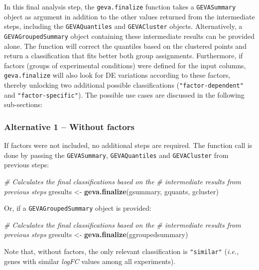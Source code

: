 \documentclass[
  12pt,
]{article}
\newenvironment{Shaded}{\begin{snugshade}}{\end{snugshade}}
\newcommand{\CommentTok}[1]{\textcolor[rgb]{0.56,0.35,0.01}{\textit{#1}}}
\newcommand{\KeywordTok}[1]{\textcolor[rgb]{0.13,0.29,0.53}{\textbf{#1}}}
\newcommand{\NormalTok}[1]{#1}
\newcommand{\StringTok}[1]{\textcolor[rgb]{0.31,0.60,0.02}{#1}}
\begin{document}
In this final analysis step, the \texttt{geva.finalize} function takes a
\texttt{GEVASummary} object as argument in addition to the other values
returned from the intermediate steps, including the
\texttt{GEVAQuantiles} and \texttt{GEVACluster} objects. Alternatively,
a \texttt{GEVAGroupedSummary} object containing these intermediate
results can be provided alone. The function will correct the quantiles
based on the clustered points and return a classification that fits
better both group assignments. Furthermore, if factors (groups of
experimental conditions) were defined for the input columns,
\texttt{geva.finalize} will also look for DE variations according to
these factors, thereby unlocking two additional possible classifications
(\texttt{"factor-dependent"} and \texttt{"factor-specific"}). The
possible use cases are discussed in the following sub-sections:

\hypertarget{alternative-1-without-factors}{%
\subsubsection{Alternative 1 -- Without
factors}\label{alternative-1-without-factors}}

If factors were not included, no additional steps are required. The
function call is done by passing the \texttt{GEVASummary},
\texttt{GEVAQuantiles} and \texttt{GEVACluster} from previous steps:

\begin{Shaded}
\begin{Highlighting}[]
\CommentTok{# Calculates the final classifications based on the}
\CommentTok{# intermediate results from previous steps}
\NormalTok{gresults <-}\StringTok{ }\KeywordTok{geva.finalize}\NormalTok{(gsummary, gquants, gcluster)}
\end{Highlighting}
\end{Shaded}

Or, if a \texttt{GEVAGroupedSummary} object is provided:

\begin{Shaded}
\begin{Highlighting}[]
\CommentTok{# Calculates the final classifications based on the}
\CommentTok{# intermediate results from previous steps}
\NormalTok{gresults <-}\StringTok{ }\KeywordTok{geva.finalize}\NormalTok{(ggroupedsummary)}
\end{Highlighting}
\end{Shaded}

Note that, without factors, the only relevant classification is
\texttt{"similar"} (\emph{i.e.}, genes with similar \emph{logFC} values
among all experiments).
\end{document}
